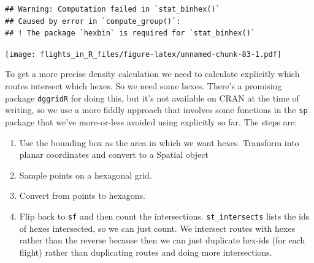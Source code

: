 \documentclass[
]{book}
\newenvironment{Shaded}{\begin{snugshade}}{\end{snugshade}}
\newcommand{\AttributeTok}[1]{\textcolor[rgb]{0.77,0.63,0.00}{#1}}
\newcommand{\DecValTok}[1]{\textcolor[rgb]{0.00,0.00,0.81}{#1}}
\newcommand{\FloatTok}[1]{\textcolor[rgb]{0.00,0.00,0.81}{#1}}
\newcommand{\FunctionTok}[1]{\textcolor[rgb]{0.00,0.00,0.00}{#1}}
\newcommand{\NormalTok}[1]{#1}
\newcommand{\SpecialCharTok}[1]{\textcolor[rgb]{0.00,0.00,0.00}{#1}}
\newcommand{\StringTok}[1]{\textcolor[rgb]{0.31,0.60,0.02}{#1}}
\providecommand{\tightlist}{%
  \setlength{\itemsep}{0pt}\setlength{\parskip}{0pt}}
\begin{document}
\begin{Shaded}
\end{Shaded}

\begin{verbatim}
## Warning: Computation failed in `stat_binhex()`
## Caused by error in `compute_group()`:
## ! The package `hexbin` is required for `stat_binhex()`
\end{verbatim}

\texttt{[image: flights\_in\_R\_files/figure-latex/unnamed-chunk-83-1.pdf]}

To get a more precise density calculation we need to calculate explicitly which routes intersect which hexes. So we need some hexes. There's a promising package \texttt{dggridR} for doing this, but it's not available on CRAN at the time of writing, so we use a more fiddly approach that involves some functions in the \texttt{sp} package that we've more-or-less avoided using explicitly so far. The steps are:

\begin{enumerate}
\def\labelenumi{\arabic{enumi})}
\tightlist
\item
  Use the bounding box as the area in which we want hexes. Transform into planar coordinates and convert to a Spatial object
\item
  Sample points on a hexagonal grid.
\item
  Convert from points to hexagons.
\item
  Flip back to \texttt{sf} and then count the intersections. \texttt{st\_intersects} lists the ids of hexes intersected, so we can just count. We intersect routes with hexes rather than the reverse because then we can just duplicate hex-ids (for each flight) rather than duplicating routes and doing more intersections.
\end{enumerate}
\end{document}
